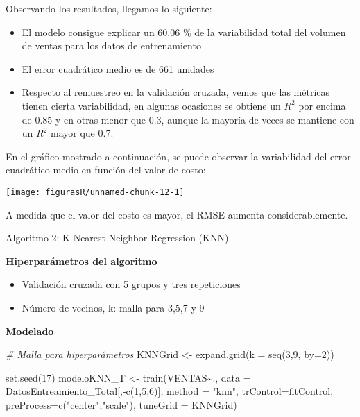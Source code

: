 \documentclass[
]{article}
\newenvironment{Shaded}{\begin{snugshade}}{\end{snugshade}}
\newcommand{\AttributeTok}[1]{\textcolor[rgb]{0.77,0.63,0.00}{#1}}
\newcommand{\CommentTok}[1]{\textcolor[rgb]{0.56,0.35,0.01}{\textit{#1}}}
\newcommand{\DecValTok}[1]{\textcolor[rgb]{0.00,0.00,0.81}{#1}}
\newcommand{\FunctionTok}[1]{\textcolor[rgb]{0.00,0.00,0.00}{#1}}
\newcommand{\NormalTok}[1]{#1}
\newcommand{\OtherTok}[1]{\textcolor[rgb]{0.56,0.35,0.01}{#1}}
\newcommand{\SpecialCharTok}[1]{\textcolor[rgb]{0.00,0.00,0.00}{#1}}
\newcommand{\StringTok}[1]{\textcolor[rgb]{0.31,0.60,0.02}{#1}}
\providecommand{\tightlist}{%
  \setlength{\itemsep}{0pt}\setlength{\parskip}{0pt}}
\begin{document}
Observando los resultados, llegamos lo siguiente:

\begin{itemize}
\tightlist
\item
  El modelo consigue explicar un 60.06 \% de la variabilidad total del
  volumen de ventas para los datos de entrenamiento
\item
  El error cuadrático medio es de 661 unidades
\item
  Respecto al remuestreo en la validación cruzada, vemos que las
  métricas tienen cierta variabilidad, en algunas ocasiones se obtiene
  un \(R^2\) por encima de 0.85 y en otras menor que 0.3, aunque la
  mayoría de veces se mantiene con un \(R^2\) mayor que 0.7.
\end{itemize}

En el gráfico mostrado a continuación, se puede observar la variabilidad
del error cuadrático medio en función del valor de costo:

\begin{center}\texttt{[image: figurasR/unnamed-chunk-12-1]} \end{center}

A medida que el valor del costo es mayor, el RMSE aumenta
considerablemente.

Algoritmo 2: K-Nearest Neighbor Regression (KNN)

\textbf{Hiperparámetros del algoritmo}

\begin{itemize}
\tightlist
\item
  Validación cruzada con 5 grupos y tres repeticiones
\item
  Número de vecinos, k: malla para 3,5,7 y 9
\end{itemize}

\textbf{Modelado}

\begin{Shaded}
\begin{Highlighting}[]
\CommentTok{\# Malla para hiperparámetros}
\NormalTok{KNNGrid }\OtherTok{\textless{}{-}}  \FunctionTok{expand.grid}\NormalTok{(}\AttributeTok{k =} \FunctionTok{seq}\NormalTok{(}\DecValTok{3}\NormalTok{,}\DecValTok{9}\NormalTok{, }\AttributeTok{by=}\DecValTok{2}\NormalTok{))}

\FunctionTok{set.seed}\NormalTok{(}\DecValTok{17}\NormalTok{)}
\NormalTok{modeloKNN\_T }\OtherTok{\textless{}{-}} \FunctionTok{train}\NormalTok{(VENTAS}\SpecialCharTok{\textasciitilde{}}\NormalTok{., }
                \AttributeTok{data =}\NormalTok{ DatosEntreamiento\_Total[,}\SpecialCharTok{{-}}\FunctionTok{c}\NormalTok{(}\DecValTok{1}\NormalTok{,}\DecValTok{5}\NormalTok{,}\DecValTok{6}\NormalTok{)], }
                \AttributeTok{method =} \StringTok{"knn"}\NormalTok{, }
                \AttributeTok{trControl=}\NormalTok{fitControl, }
                \AttributeTok{preProcess=}\FunctionTok{c}\NormalTok{(}\StringTok{"center"}\NormalTok{,}\StringTok{"scale"}\NormalTok{),}
                \AttributeTok{tuneGrid =}\NormalTok{ KNNGrid)}
\end{Highlighting}
\end{Shaded}
\end{document}
